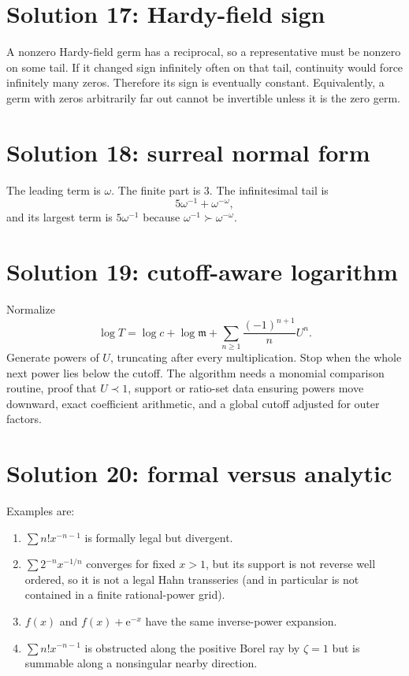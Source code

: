 \documentclass[11pt,oneside,openany]{book}
\newcommand{\e}{\mathrm{e}}
\newcommand{\mon}{\mathfrak{m}}
\theoremstyle{plain}
\theoremstyle{definition}
\theoremstyle{remark}
\begin{document}
\section*{Solution 17: Hardy-field sign}
A nonzero Hardy-field germ has a reciprocal, so a representative must be nonzero on some tail. If it changed sign infinitely often on that tail, continuity would force infinitely many zeros. Therefore its sign is eventually constant. Equivalently, a germ with zeros arbitrarily far out cannot be invertible unless it is the zero germ.

\section*{Solution 18: surreal normal form}
The leading term is $\omega$. The finite part is $3$. The infinitesimal tail is
\[
  5\omega^{-1}+\omega^{-\omega},
\]
and its largest term is $5\omega^{-1}$ because $\omega^{-1}\succ\omega^{-\omega}$.

\section*{Solution 19: cutoff-aware logarithm}
Normalize
\[
  \log T=\log c+\log\mon+
  \sum_{n\ge1}\frac{(-1)^{n+1}}nU^n.
\]
Generate powers of $U$, truncating after every multiplication. Stop when the whole next power lies below the cutoff. The algorithm needs a monomial comparison routine, proof that $U\prec1$, support or ratio-set data ensuring powers move downward, exact coefficient arithmetic, and a global cutoff adjusted for outer factors.

\section*{Solution 20: formal versus analytic}
Examples are:
\begin{enumerate}
  \item $\sum n!x^{-n-1}$ is formally legal but divergent.
  \item $\sum2^{-n}x^{-1/n}$ converges for fixed $x>1$, but its support is not reverse well ordered, so it is not a legal Hahn transseries (and in particular is not contained in a finite rational-power grid).
  \item $f(x)$ and $f(x)+\e^{-x}$ have the same inverse-power expansion.
  \item $\sum n!x^{-n-1}$ is obstructed along the positive Borel ray by $\zeta=1$ but is summable along a nonsingular nearby direction.
\end{enumerate}
\end{document}
